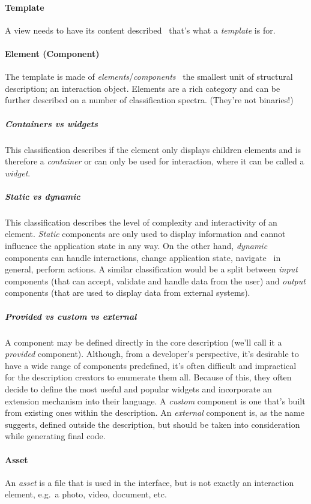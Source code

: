 \paragraph{Template}
A view needs to have its content described \textendash\ that's what a \emph{template} is for.

\paragraph{Element (Component)}
The template is made of \emph{elements}/\emph{components} \textendash\ the smallest unit of structural description;
an interaction object.
Elements are a rich category and can be further described on a number of classification spectra.
(They're not binaries!)


\subparagraph{Containers vs widgets}
This classification describes if the element only displays children elements and is therefore a \emph{container} or can only be used for interaction, where it can be called a \emph{widget}.

\subparagraph{Static vs dynamic}
This classification describes the level of complexity and interactivity of an element.
\emph{Static} components are only used to display information and cannot influence the application state in any way.
On the other hand, \emph{dynamic} components can handle interactions, change application state, navigate \textendash\ in general, perform actions.
A similar classification would be a split between \emph{input} components (that can accept, validate and handle data from the user) and \emph{output} components (that are used to display data from external systems).

\subparagraph{Provided vs custom vs external}
A component may be defined directly in the core description (we'll call it a \emph{provided} component).
Although, from a developer's perspective, it's desirable to have a wide range of components predefined, it's often difficult and impractical for the description creators to enumerate them all.
Because of this, they often decide to define the most useful and popular widgets and incorporate an extension mechanism into their language.
A \emph{custom} component is one that's built from existing ones within the description.
An \emph{external} component is, as the name suggests, defined outside the description, but should be taken into consideration while generating final code.

\paragraph{Asset}
An \emph{asset} is a file that is used in the interface, but is not exactly an interaction element, e.g.\ a photo, video, document, etc.

